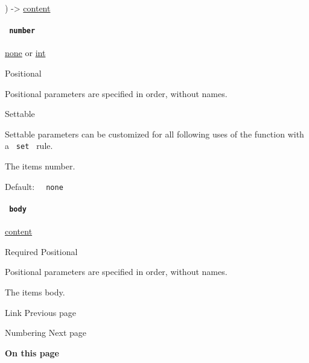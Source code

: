 ) -\textgreater{} \href{/docs/reference/foundations/content/}{content}

\paragraph{\texorpdfstring{\texttt{\ number\ }}{ number }}\label{definitions-item-number}

\href{/docs/reference/foundations/none/}{none} {or}
\href{/docs/reference/foundations/int/}{int}

{{ Positional }}

\label{definitions-item-number-positional-tooltip}
Positional parameters are specified in order, without names.

{{ Settable }}

\label{definitions-item-number-settable-tooltip}
Settable parameters can be customized for all following uses of the
function with a \texttt{\ set\ } rule.

The item\textquotesingle s number.

Default: \texttt{\ }{\texttt{\ none\ }}\texttt{\ }

\paragraph{\texorpdfstring{\texttt{\ body\ }}{ body }}\label{definitions-item-body}

\href{/docs/reference/foundations/content/}{content}

{Required} {{ Positional }}

\label{definitions-item-body-positional-tooltip}
Positional parameters are specified in order, without names.

The item\textquotesingle s body.

\href{/docs/reference/model/link/}{\pandocbounded{}}

{ Link } { Previous page }

\href{/docs/reference/model/numbering/}{\pandocbounded{}}

{ Numbering } { Next page }

\textbf{On this page}

